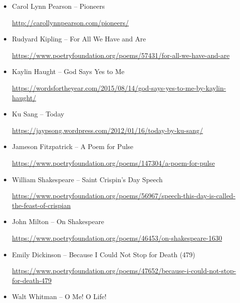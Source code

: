 \documentclass[12pt, openany, letterpaper]{memoir}
\begin{document}
\begin{itemize}
	\item Carol Lynn Pearson -- Pioneers
	
	\hyperref[http://carollynnpearson.com/pioneers/]{http://carollynnpearson.com/pioneers/}
	
	\item Rudyard Kipling -- For All We Have and Are
	
	\hyperref[https://www.poetryfoundation.org/poems/57431/for-all-we-have-and-are]{https://www.poetryfoundation.org/poems/57431/for-all-we-have-and-are}
	
	\item Kaylin Haught -- God Says Yes to Me
	
	\hyperref[https://wordsfortheyear.com/2015/08/14/god-says-yes-to-me-by-kaylin-haught/]{https://wordsfortheyear.com/2015/08/14/god-says-yes-to-me-by-kaylin-haught/}
	
	\item Ku Sang -- Today
	
	\hyperref[https://jaypsong.wordpress.com/2012/01/16/today-by-ku-sang/]{https://jaypsong.wordpress.com/2012/01/16/today-by-ku-sang/}
	
	\item Jameson Fitzpatrick -- A Poem for Pulse
	
	\hyperref[https://www.poetryfoundation.org/poems/147304/a-poem-for-pulse]{https://www.poetryfoundation.org/poems/147304/a-poem-for-pulse}
	
	\item William Shakespeare -- Saint Crispin's Day Speech
	
	\hyperref[https://www.poetryfoundation.org/poems/56967/speech-this-day-is-called-the-feast-of-crispian]{https://www.poetryfoundation.org/poems/56967/speech-this-day-is-called-the-feast-of-crispian}
	
	\item John Milton -- On Shakespeare
	
	\hyperref[https://www.poetryfoundation.org/poems/46453/on-shakespeare-1630]{https://www.poetryfoundation.org/poems/46453/on-shakespeare-1630}
	
	\item Emily Dickinson -- Because I Could Not Stop for Death (479)
	
	\hyperref[https://www.poetryfoundation.org/poems/47652/because-i-could-not-stop-for-death-479]{https://www.poetryfoundation.org/poems/47652/because-i-could-not-stop-for-death-479}
	
	\item Walt Whitman -- O Me! O Life!
	

\end{itemize}
\end{document}
